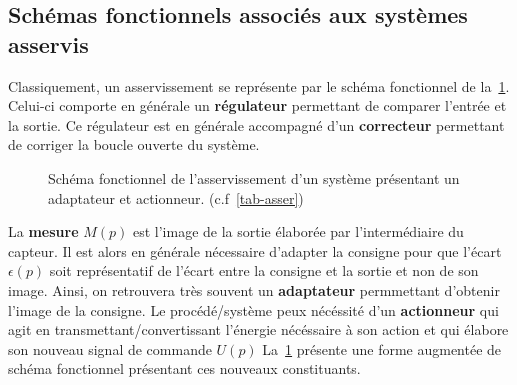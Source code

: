 \subsection{Schémas fonctionnels associés aux systèmes asservis}
Classiquement, un asservissement se représente par le schéma fonctionnel de 
la~\cref{fig-reg2}. Celui-ci comporte en générale un \textbf{régulateur}
permettant de comparer l'entrée et la sortie. Ce régulateur est en 
générale accompagné d'un \textbf{correcteur}
permettant de corriger la boucle ouverte du système.
\begin{figure}[!h]
    \centering
    
    \caption{Schéma fonctionnel de l'asservissement d'un système 
             présentant un adaptateur et actionneur. (c.f~\cref{tab-asser})
             \label{fig-reg2}}
\end{figure}
%    
La \textbf{mesure} $M(p)$ est l'image de la sortie élaborée par 
l'intermédiaire du capteur. Il est alors en générale nécessaire d'adapter la consigne pour
que l'écart $\epsilon(p)$ soit représentatif de l'écart entre la consigne
et la sortie et non de son image. Ainsi, on retrouvera très souvent 
un \textbf{adaptateur} permmettant d'obtenir l'image de la consigne.
Le procédé/système peux nécéssité d'un \textbf{actionneur} qui agit en 
transmettant/convertissant l'énergie nécéssaire à son action et qui
élabore son nouveau signal de commande $U(p)$
La~\cref{fig-reg2} présente une forme augmentée de schéma fonctionnel
présentant ces nouveaux constituants. 
